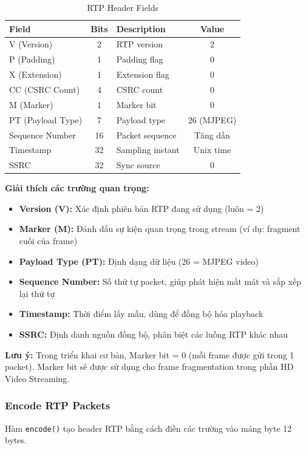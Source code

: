 \begin{table}[H]
\centering
\begin{tabular}{|l|c|l|c|}
\hline
\textbf{Field} & \textbf{Bits} & \textbf{Description} & \textbf{Value} \\
\hline
V (Version) & 2 & RTP version & 2 \\
P (Padding) & 1 & Padding flag & 0 \\
X (Extension) & 1 & Extension flag & 0 \\
CC (CSRC Count) & 4 & CSRC count & 0 \\
M (Marker) & 1 & Marker bit & 0 \\
PT (Payload Type) & 7 & Payload type & 26 (MJPEG) \\
Sequence Number & 16 & Packet sequence & Tăng dần \\
Timestamp & 32 & Sampling instant & Unix time \\
SSRC & 32 & Sync source & 0 \\
\hline
\end{tabular}
\caption{RTP Header Fields}
\end{table}

\textbf{Giải thích các trường quan trọng:}
\begin{itemize}
    \item \textbf{Version (V):} Xác định phiên bản RTP đang sử dụng (luôn = 2)
    \item \textbf{Marker (M):} Đánh dấu sự kiện quan trọng trong stream (ví dụ: fragment cuối của frame)
    \item \textbf{Payload Type (PT):} Định dạng dữ liệu (26 = MJPEG video)
    \item \textbf{Sequence Number:} Số thứ tự packet, giúp phát hiện mất mát và sắp xếp lại thứ tự
    \item \textbf{Timestamp:} Thời điểm lấy mẫu, dùng để đồng bộ hóa playback
    \item \textbf{SSRC:} Định danh nguồn đồng bộ, phân biệt các luồng RTP khác nhau
\end{itemize}

\textbf{Lưu ý:} Trong triển khai cơ bản, Marker bit = 0 (mỗi frame được gửi trong 1 packet). Marker bit sẽ được sử dụng cho frame fragmentation trong phần HD Video Streaming.

\subsubsection{Encode RTP Packets}

Hàm \texttt{encode()} tạo header RTP bằng cách điền các trường vào mảng byte 12 bytes.

